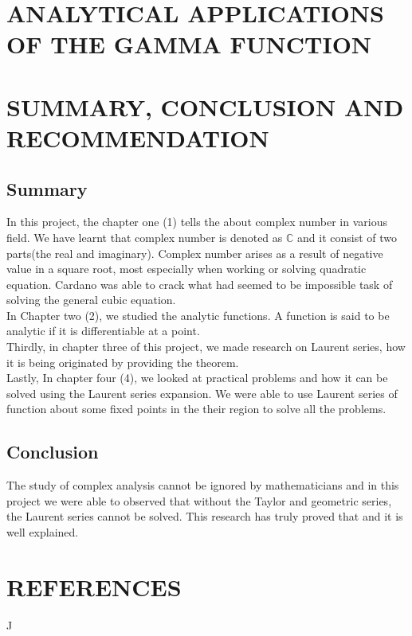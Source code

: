 \documentclass[11pt]{report}
\newcommand{\NI}{\noindent}
\newcommand{\complex}{\mathbb{C}}
\begin{document}
	
	
	\chapter{ANALYTICAL APPLICATIONS OF THE GAMMA FUNCTION}
	


	
	\chapter{SUMMARY, CONCLUSION AND RECOMMENDATION}
	\section{Summary}
	In this project, the chapter one (1) tells the about complex number in various field. We have learnt that complex number is denoted as $\complex$ and it consist of two parts(the real and imaginary). Complex number arises as a result of negative value in a square root, most especially when working or solving quadratic equation. Cardano was able to crack what had seemed to be impossible task of solving the general cubic equation.\\
	
	\NI In Chapter two (2), we studied the analytic functions. A function is said to be analytic if it is differentiable at a point.\\
	
	\NI Thirdly, in chapter three of this project, we made research on Laurent series, how it is being originated by providing the theorem.\\
	
	\NI Lastly, In chapter four (4), we looked at practical problems and how it can be solved using the Laurent series expansion. We were able to use Laurent series of function about some fixed points in the their region to solve all the problems.
	\section{Conclusion}
	The study of complex analysis cannot be ignored by mathematicians and in this project we were able to observed that without the Taylor and geometric series, the Laurent series cannot be solved. This research has truly proved that and it is well explained.
	

	
	\chapter*{REFERENCES}
	
	\begin{description}
		\item J
		
	\end{description}
	
\end{document}
